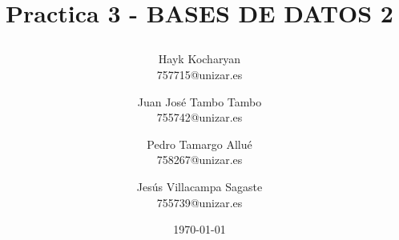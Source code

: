 \documentclass{article}
\begin{document}
\begin{titlepage}
	\title{
		\begin{Huge}
			Practica 3 - BASES DE DATOS 2
		\end{Huge}
	}
	\author{
	  Hayk Kocharyan\\
	  757715@unizar.es
	  \and
	  Juan José Tambo Tambo\\
	  755742@unizar.es
	  \and
	  Pedro Tamargo Allué\\
	  758267@unizar.es
	  \and
	  Jesús Villacampa Sagaste\\
	  755739@unizar.es
	}
	\date{\today}
	
	\clearpage\maketitle
	\thispagestyle{empty}
	\tableofcontents
	\listoffigures

\end{titlepage}

\newpage 
\end{document}

